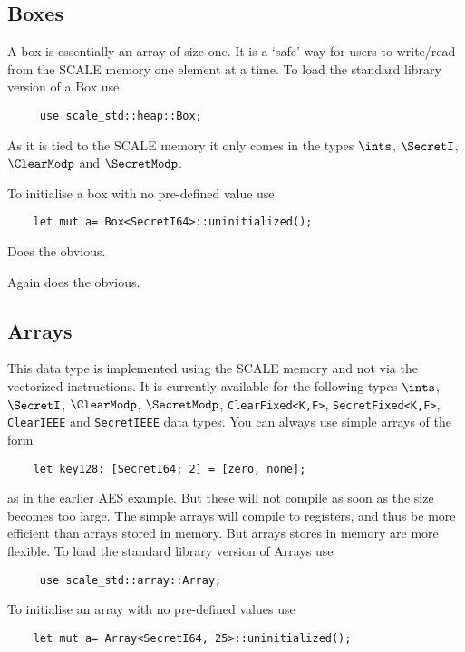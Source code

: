 

\subsection{Boxes}
A box is essentially an array of size one. It is a `safe' way for users
to write/read from the SCALE memory one element at a time.
To load the standard library version of a Box use
\begin{lstlisting}
     use scale_std::heap::Box;
\end{lstlisting}
As it is tied to the SCALE memory it only comes in the
types  $\ints$, $\SecretI$, $\ClearModp$ and $\SecretModp$.

To initialise a box with no pre-defined value use
\begin{lstlisting}
    let mut a= Box<SecretI64>::uninitialized();
\end{lstlisting}

Does the obvious.

Again does the obvious.


\subsection{Arrays}
This data type is implemented using the SCALE memory and not
via the vectorized instructions.
It is currently available for the following types
$\ints$, $\SecretI$, $\ClearModp$, $\SecretModp$,
\verb|ClearFixed<K,F>|, \verb|SecretFixed<K,F>|,
\verb|ClearIEEE| and \verb|SecretIEEE|
data types.
You can always use simple arrays of the form
\begin{lstlisting}
    let key128: [SecretI64; 2] = [zero, none];
\end{lstlisting}
as in the earlier AES example. But these will not compile as
soon as the size becomes too large. The simple arrays will
compile to registers, and thus be more efficient than arrays
stored in memory. But arrays stores in memory are more flexible.
To load the standard library version of Arrays use
\begin{lstlisting}
     use scale_std::array::Array;
\end{lstlisting}

To initialise an array with no pre-defined values use
\begin{lstlisting}
    let mut a= Array<SecretI64, 25>::uninitialized();
\end{lstlisting}


